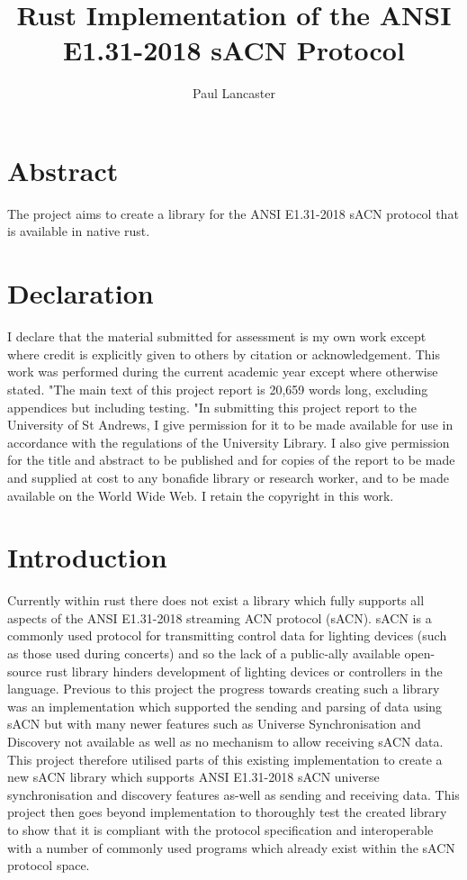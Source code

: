 \documentclass[11pt,a4paper]{article}
\author{Paul Lancaster}
\title{Rust Implementation of the ANSI E1.31-2018 sACN Protocol}
\begin{document}


\section{Abstract}
The project aims to create a library for the ANSI E1.31-2018 sACN protocol \cite{ANSI_E1.31} that is available in native rust.

\section{Declaration}
I declare that the material submitted for
assessment is my own work except where credit is
explicitly given to others by citation or
acknowledgement. This work was performed during
the current academic year except where otherwise
stated.
"The main text of this project report is 20,659
words long, excluding appendices but including testing.
"In submitting this project report to the University of
St Andrews, I give permission for it to be made
available for use in accordance with the regulations of the University Library. I also give permission for
the title and abstract to be published and for copies of the report to be made and supplied at cost to any bonafide library or research worker, and to be made
available on the World Wide Web. I retain the
copyright in this work.

\pagebreak
\tableofcontents
\pagebreak

\section{Introduction}
Currently within rust there does not exist a library which fully supports all aspects of the ANSI E1.31-2018 streaming ACN protocol \cite{ANSI_E1.31} (sACN). sACN is a commonly used protocol for transmitting control data for lighting devices (such as those used during concerts) and so the lack of a public-ally available open-source rust library hinders development of lighting devices or controllers in the language. Previous to this project the progress towards creating such a library was an implementation \cite{ORIGINAL_IMPL} which supported the sending and parsing of data using sACN but with many newer features such as Universe Synchronisation and Discovery not available as well as no mechanism to allow receiving sACN data. This project therefore utilised parts of this existing implementation to create a new sACN library which supports ANSI E1.31-2018 sACN universe synchronisation and discovery features as-well as sending and receiving data. This project then goes beyond implementation to thoroughly test the created library to show that it is compliant with the protocol specification and interoperable with a number of commonly used programs which already exist within the sACN protocol space. \\
\end{document}
